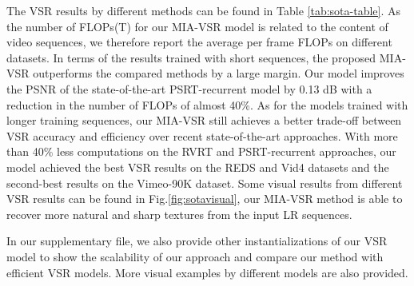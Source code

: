 \documentclass[10pt,twocolumn,letterpaper]{article}
\begin{document}
The VSR results by different methods can be found in Table \ref{tab:sota-table}.
%
As the number of FLOPs(T) for our MIA-VSR model is related to the content of video sequences, we therefore report the average per frame FLOPs on different datasets.
%
In terms of the results trained with short sequences, the proposed MIA-VSR outperforms the compared methods by a large margin.
%
Our model improves the PSNR of the state-of-the-art PSRT-recurrent model by 0.13 dB with a reduction in the number of FLOPs of almost 40\%.
%
As for the models trained with longer training sequences, our MIA-VSR still achieves a better trade-off between VSR accuracy and efficiency over recent state-of-the-art approaches.
%
With more than 40\% less computations on the RVRT and PSRT-recurrent approaches, our model achieved the best VSR results
on the REDS and Vid4 datasets and the second-best results on the Vimeo-90K dataset.
%
Some visual results from different VSR results can be found in Fig.\ref{fig:sotavisual}, our MIA-VSR method is able to recover more natural and sharp textures from the input LR sequences.
%

In our supplementary file, we also provide other instantializations of our VSR model to show the scalability of our approach and compare our method with efficient VSR models.
%
More visual examples by different models are also provided.
\end{document}
